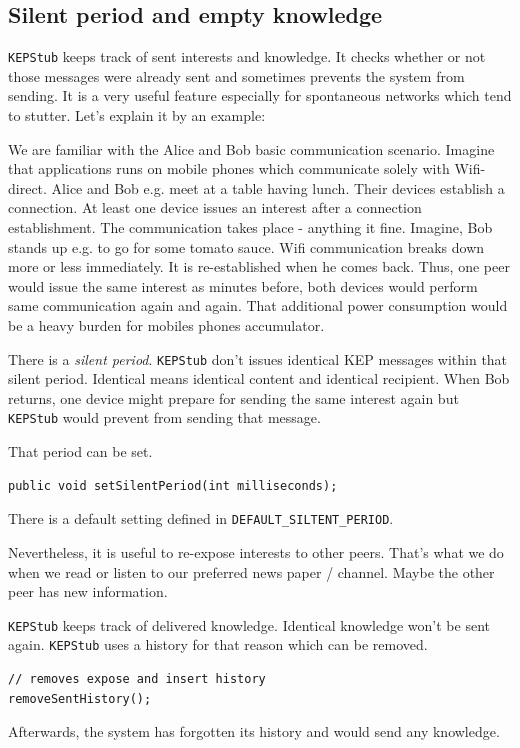 \subsection{Silent period and empty knowledge}
{\tt KEPStub} keeps track of sent interests and knowledge. It checks whether 
or not those messages were already sent and sometimes prevents the system from sending. 
It is a very useful feature especially for spontaneous networks which tend to stutter. Let's explain it by an example:

We are familiar with the Alice and Bob basic communication scenario. Imagine that applications runs on mobile phones which communicate solely with Wifi-direct. Alice and Bob e.g. meet at a table having lunch. Their devices establish a connection. At least one device issues an interest after a connection establishment. The communication takes place - anything it fine.
Imagine, Bob stands up e.g. to go for some tomato sauce. Wifi communication breaks down more or less immediately. It is re-established when he comes back.
Thus, one peer would issue the same interest as minutes before, both devices would perform same communication again and again. That additional power consumption would be a heavy burden for mobiles phones accumulator.

There is a {\it silent period}. {\tt KEPStub} don't issues identical KEP messages within that silent period. Identical means identical content and identical recipient. When Bob returns, one device might prepare for sending the same interest again but {\tt KEPStub} would prevent from sending that message.

That period can be set.
\begin{verbatim}
public void setSilentPeriod(int milliseconds);
\end{verbatim}

There is a default setting defined in {\tt DEFAULT\_SILTENT\_PERIOD}.

Nevertheless, it is useful to re-expose interests to other peers. That's what we do when we read or listen to our preferred news paper / channel. Maybe the other peer has new information.

{\tt KEPStub} keeps track of delivered knowledge. Identical knowledge won't be sent again. {\tt KEPStub} uses a history for that reason which can be removed.

\begin{verbatim}
// removes expose and insert history
removeSentHistory();
\end{verbatim}
Afterwards, the system has forgotten its history and would send any knowledge.

